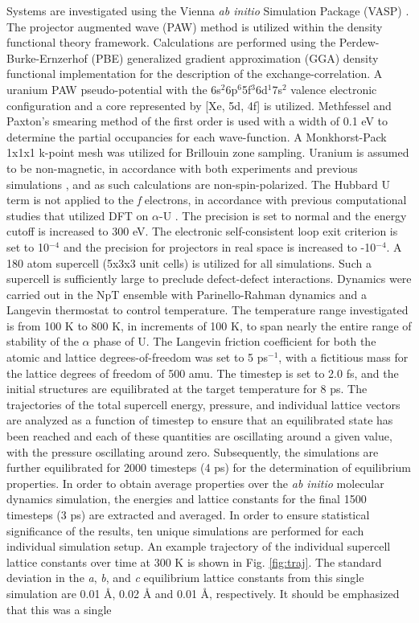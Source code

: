 \documentclass[utf8]{frontiersSCNS} %
\begin{document}
Systems are investigated using the Vienna \textit{ab initio} Simulation Package (VASP) \cite{vasp1, vasp2, vasp3, vasp4}. The projector augmented wave (PAW) method \cite{paw1, paw2} is utilized within the density functional theory \cite{dft1, dft2} framework. Calculations are performed using the Perdew-Burke-Ernzerhof (PBE) \cite{pbe1, pbe2} generalized gradient approximation (GGA) density functional implementation for the description of the exchange-correlation. A uranium PAW pseudo-potential with the 6s$^{2}$6p$^{6}$5f$^{3}$6d$^{1}$7s$^{2}$ valence electronic configuration and a core represented by [Xe, 5d, 4f] is utilized. Methfessel and Paxton's smearing method \cite{methfessel} of the first order is used with a width of 0.1 eV to determine the partial occupancies for each wave-function. A Monkhorst-Pack \cite{monkhorst} 1x1x1 k-point mesh was utilized for Brillouin zone sampling. Uranium is assumed to be non-magnetic, in accordance with both experiments \cite{chembook} and previous simulations \cite{beeler2013}, and as such calculations are non-spin-polarized. The Hubbard U term is not applied to the \textit{f} electrons, in accordance with previous computational studies that utilized DFT on $\alpha$-U \cite{wirth2011, wirth2012, taylor2008, beeler2013}. The precision is set to normal and the energy cutoff is increased to 300 eV. The electronic self-consistent loop exit criterion is set to 10$^{-4}$ and the precision for projectors in real space is increased to -10$^{-4}$. A 180 atom supercell (5x3x3 unit cells) is utilized for all simulations. Such a supercell is sufficiently large to preclude defect-defect interactions. Dynamics were carried out in the NpT ensemble with Parinello-Rahman dynamics and a Langevin thermostat to control temperature. The temperature range investigated is from 100 K to 800 K, in increments of 100 K, to span nearly the entire range of stability of the $\alpha$ phase of U. The Langevin friction coefficient for both the atomic and lattice degrees-of-freedom was set to 5 ps$^{-1}$, with a fictitious mass for the lattice degrees of freedom of 500 amu. The timestep is set to 2.0 fs, and the initial structures are equilibrated at the target temperature for 8 ps. The trajectories of the total supercell energy, pressure, and individual lattice vectors are analyzed as a function of timestep to ensure that an equilibrated state has been reached and each of these quantities are oscillating around a given value, with the pressure oscillating around zero. Subsequently, the simulations are further equilibrated for 2000 timesteps (4 ps) for the determination of equilibrium properties. In order to obtain average properties over the \textit{ab initio} molecular dynamics simulation, the energies and lattice constants for the final 1500 timesteps (3 ps) are extracted and averaged. In order to ensure statistical significance of the results, ten unique simulations are performed for each individual simulation setup. An example trajectory of the individual supercell lattice constants over time at 300 K is shown in Fig. \ref{fig:traj}. The standard deviation in the \textit{a}, \textit{b}, and \textit{c} equilibrium lattice constants from this single simulation are 0.01 \AA, 0.02 {\AA} and 0.01 \AA, respectively. It should be emphasized that this was a single 
\end{document}
